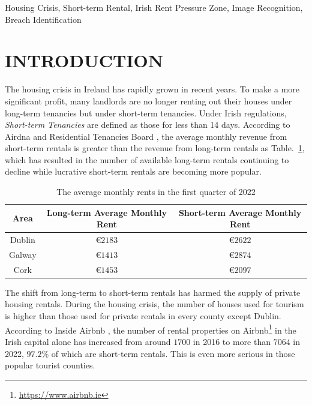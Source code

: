 \documentclass[conference, compsoc]{IEEEtran}
\begin{document}
\begin{IEEEkeywords}
Housing Crisis, Short-term Rental, Irish Rent Pressure Zone, Image Recognition, Breach Identification
\end{IEEEkeywords}


\section{INTRODUCTION}
The housing crisis in Ireland has rapidly grown in recent years.
To make a more significant profit, many landlords are no longer renting out their houses under long-term tenancies but under short-term tenancies.
Under Irish regulations, \emph{Short-term Tenancies} are defined as those for less than 14 days.
According to Airdna \cite{airdna-rental-data} and Residential Tenancies Board \cite{residential-tenancies-board-report}, the average monthly revenue from short-term rentals is greater than the revenue from long-term rentals as Table.~\ref{tbl:rent-revenue},
which has resulted in the number of available long-term rentals continuing to decline while lucrative short-term rentals are becoming more popular.

\begin{table}[htbp]
    \caption{The average monthly rents in the first quarter of 2022}
    \begin{center}
        \begin{tabular}{ccc}
            \toprule
            Area & Long-term Average Monthly Rent & Short-term Average Monthly Rent \\
            \midrule
            Dublin & \euro$2183$ & \euro$2622$ \\
            Galway & \euro$1413$ & \euro$2874$ \\
            Cork & \euro$1453$ & \euro$2097$ \\
            \bottomrule
        \end{tabular}
    \end{center}
    \label{tbl:rent-revenue}
\end{table}

The shift from long-term to short-term rentals has harmed the supply of private housing rentals.
During the housing crisis, the number of houses used for tourism is higher than those used for private rentals in every county except Dublin.
According to Inside Airbnb \cite{inside-airbnb}, the number of rental properties on Airbnb\footnote{\url{https://www.airbnb.ie}} in the Irish capital alone has increased from around $1700$ in 2016 to more than $7064$ in 2022, $97.2\%$ of which are short-term rentals.
This is even more serious in those popular tourist counties.
\end{document}
